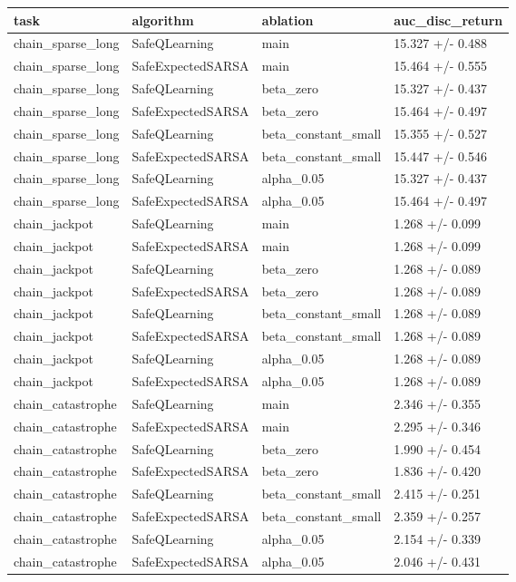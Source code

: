 \begin{tabular}{llll}
\toprule
task & algorithm & ablation & auc_disc_return \\
\midrule
chain_sparse_long & SafeQLearning & main & 15.327 +/- 0.488 \\
chain_sparse_long & SafeExpectedSARSA & main & 15.464 +/- 0.555 \\
chain_sparse_long & SafeQLearning & beta_zero & 15.327 +/- 0.437 \\
chain_sparse_long & SafeExpectedSARSA & beta_zero & 15.464 +/- 0.497 \\
chain_sparse_long & SafeQLearning & beta_constant_small & 15.355 +/- 0.527 \\
chain_sparse_long & SafeExpectedSARSA & beta_constant_small & 15.447 +/- 0.546 \\
chain_sparse_long & SafeQLearning & alpha_0.05 & 15.327 +/- 0.437 \\
chain_sparse_long & SafeExpectedSARSA & alpha_0.05 & 15.464 +/- 0.497 \\
chain_jackpot & SafeQLearning & main & 1.268 +/- 0.099 \\
chain_jackpot & SafeExpectedSARSA & main & 1.268 +/- 0.099 \\
chain_jackpot & SafeQLearning & beta_zero & 1.268 +/- 0.089 \\
chain_jackpot & SafeExpectedSARSA & beta_zero & 1.268 +/- 0.089 \\
chain_jackpot & SafeQLearning & beta_constant_small & 1.268 +/- 0.089 \\
chain_jackpot & SafeExpectedSARSA & beta_constant_small & 1.268 +/- 0.089 \\
chain_jackpot & SafeQLearning & alpha_0.05 & 1.268 +/- 0.089 \\
chain_jackpot & SafeExpectedSARSA & alpha_0.05 & 1.268 +/- 0.089 \\
chain_catastrophe & SafeQLearning & main & 2.346 +/- 0.355 \\
chain_catastrophe & SafeExpectedSARSA & main & 2.295 +/- 0.346 \\
chain_catastrophe & SafeQLearning & beta_zero & 1.990 +/- 0.454 \\
chain_catastrophe & SafeExpectedSARSA & beta_zero & 1.836 +/- 0.420 \\
chain_catastrophe & SafeQLearning & beta_constant_small & 2.415 +/- 0.251 \\
chain_catastrophe & SafeExpectedSARSA & beta_constant_small & 2.359 +/- 0.257 \\
chain_catastrophe & SafeQLearning & alpha_0.05 & 2.154 +/- 0.339 \\
chain_catastrophe & SafeExpectedSARSA & alpha_0.05 & 2.046 +/- 0.431 \\
\bottomrule
\end{tabular}

